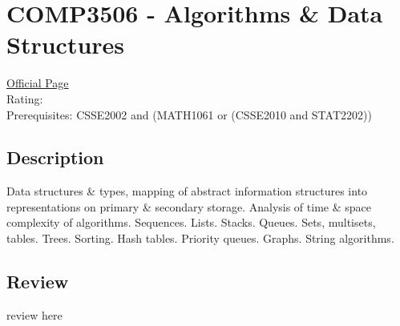 \hypertarget{COMP3506}{\section{COMP3506 - Algorithms \& Data Structures}}

\large
\textcolor{turbo_purple}{\href{https://my.uq.edu.au/programs-courses/course.html?course_code=COMP3506}{Official Page}} \\
Rating: \cstar\cstar\cstar\cstar\ostar \\
Prerequisites: CSSE2002 and (MATH1061 or (CSSE2010 and STAT2202))

\normalsize
\subsection*{Description}
Data structures \& types, mapping of abstract information structures into representations on primary \& secondary storage. Analysis of time \& space complexity of algorithms. Sequences. Lists. Stacks. Queues. Sets, multisets, tables. Trees. Sorting. Hash tables. Priority queues. Graphs. String algorithms.

\subsection*{Review}
review here

